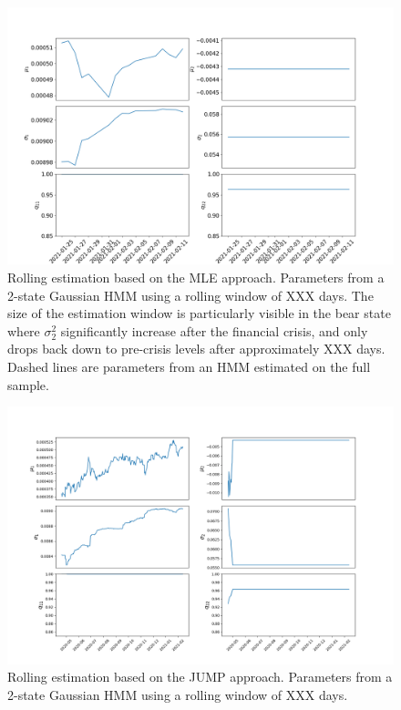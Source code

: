 \begin{figure}[H] 
    \centering
    \includegraphics[width=1.0\textwidth]{analysis/stylized_facts/2-state MLE HMM rolling params.png}
    \caption{Rolling estimation based on the MLE approach. Parameters from a 2-state Gaussian HMM using a rolling window of XXX days. The size of the estimation window is particularly visible in the bear state where $\sigma_2^2$ significantly increase after the financial crisis, and only drops back down to pre-crisis levels after approximately XXX days. Dashed lines are parameters from an HMM estimated on the full sample.}
    \label{fig: MLE estimation rolling parameters} 
\end{figure}

\begin{figure}[H] 
    \centering
    \includegraphics[width=1.0\textwidth]{analysis/stylized_facts/2-state JUMP HMM rolling params.png}
    \caption{Rolling estimation based on the JUMP approach. Parameters from a 2-state Gaussian HMM using a rolling window of XXX days.}
    \label{fig: Jump estimation rolling parameters} 
\end{figure}

